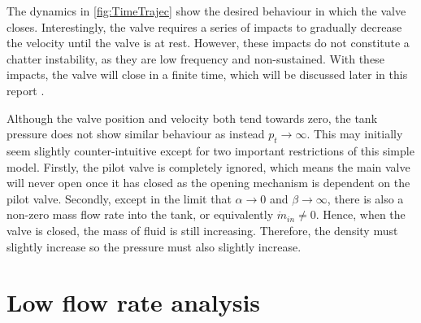 The dynamics in \cref{fig:TimeTrajec} show the desired behaviour in which the valve closes. Interestingly, the valve requires a series of impacts to gradually decrease the velocity until the valve is at rest. However, these impacts do not constitute a chatter instability, as they are low frequency and non-sustained. With these impacts, the valve will close in a finite time, which will be discussed later in this report%
.

Although the valve position and velocity both tend towards zero, the tank pressure does not show similar behaviour as instead $p_t \rightarrow \infty$. This may initially seem slightly counter-intuitive except for two important restrictions of this simple model. Firstly, the pilot valve is completely ignored, which means the main valve will never open once it has closed as the opening mechanism is dependent on the pilot valve. Secondly, except in the limit that $\alpha \rightarrow 0$ and $\beta \rightarrow \infty$, there is also a non-zero mass flow rate into the tank, or equivalently $\dot{m}_{in} \neq 0$. Hence, when the valve is closed, the mass of fluid is still increasing. Therefore, the density must slightly increase so the pressure must also slightly increase.




\section{Low flow rate analysis}

